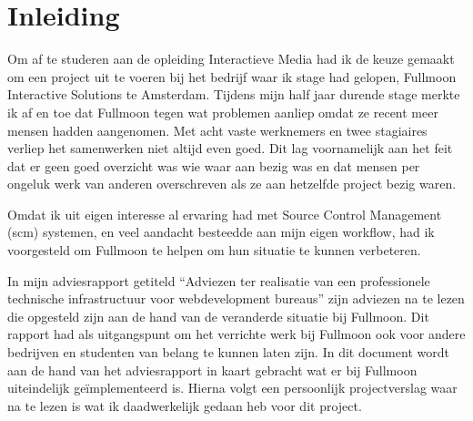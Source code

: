 \chapter{Inleiding}

Om af te studeren aan de opleiding Interactieve Media had ik de keuze gemaakt om een project uit te voeren bij het bedrijf waar ik stage had gelopen, Fullmoon Interactive Solutions te Amsterdam. Tijdens mijn half jaar durende stage merkte ik af en toe dat Fullmoon tegen wat problemen aanliep omdat ze recent meer mensen hadden aangenomen. Met acht vaste werknemers en twee stagiaires verliep het samenwerken niet altijd even goed. Dit lag voornamelijk aan het feit dat er geen goed overzicht was wie waar aan bezig was en dat mensen per ongeluk werk van anderen overschreven als ze aan hetzelfde project bezig waren.

Omdat ik uit eigen interesse al ervaring had met Source Control Management ({\sc scm}) systemen, en veel aandacht besteedde aan mijn eigen workflow, had ik voorgesteld om Fullmoon te helpen om hun situatie te kunnen verbeteren.

In mijn adviesrapport getiteld ``Adviezen ter realisatie van een professionele technische infrastructuur voor webdevelopment bureaus'' zijn adviezen na te lezen die opgesteld zijn aan de hand van de veranderde situatie bij Fullmoon. Dit rapport had als uitgangspunt om het verrichte werk bij Fullmoon ook voor andere bedrijven en studenten van belang te kunnen laten zijn. In dit document wordt aan de hand van het adviesrapport in kaart gebracht wat er bij Fullmoon uiteindelijk geïmplementeerd is. Hierna volgt een persoonlijk projectverslag waar na te lezen is wat ik daadwerkelijk gedaan heb voor dit project.
